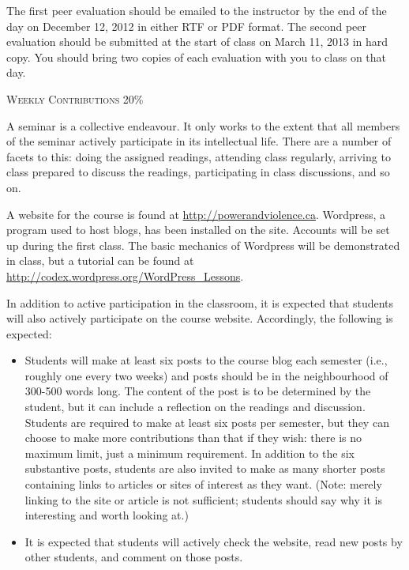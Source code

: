 \documentclass[12pt]{article}
\begin{document}
The first peer evaluation should be emailed to the instructor by the end of the day on December 12, 2012 in either RTF or PDF format. The second peer evaluation should be submitted at the start of class on March 11, 2013 in hard copy. You should bring two copies of each evaluation with you to class on that day.

{\large \textsc{Weekly Contributions 20\%}}

A seminar is a collective endeavour. It only works to the extent that all members of the seminar actively participate in its intellectual life. There are a number of facets to this: doing the assigned readings, attending class regularly, arriving to class prepared to discuss the readings, participating in class discussions, and so on. 

A website for the course is found at \href{http://powerandviolence.ca}{http://powerandviolence.ca}. Wordpress, a program used to host blogs, has been installed on the site. Accounts will be set up during the first class. The basic mechanics of Wordpress will be demonstrated in class, but a tutorial can be found at \href{http://codex.wordpress.org/WordPress\_Lessons}{http://codex.wordpress.org/WordPress\_Lessons}.

In addition to active participation in the classroom, it is expected that students will also actively participate on the course website. Accordingly, the following is expected:

\begin{itemize}
\item Students will make at least six posts to the course blog each semester (i.e., roughly one every two weeks) and posts should be in the neighbourhood of 300-500 words long. The content of the post is to be determined by the student, but it can include a reflection on the readings and discussion. Students are required to make at least six posts per semester, but they can choose to make more contributions than that if they wish: there is no maximum limit, just a minimum requirement. In addition to the six substantive posts, students are also invited to make as many shorter posts containing links to articles or sites of interest as they want. (Note: merely linking to the site or article is not sufficient; students should say why it is interesting and worth looking at.)
\item It is expected that students will actively check the website, read new posts by other students, and comment on those posts.
\end{itemize}
\end{document}
